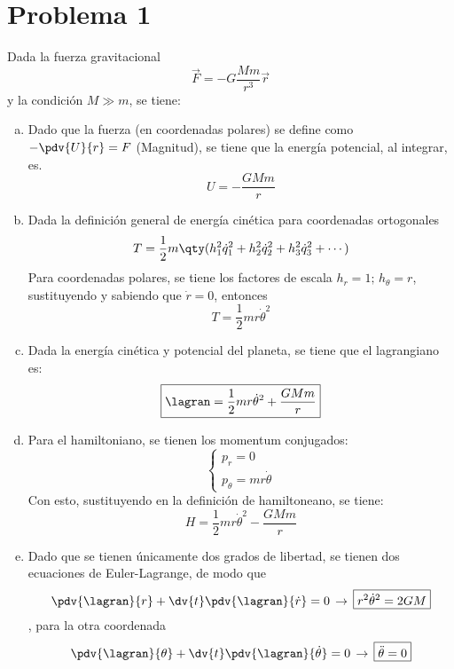 

\section{Problema 1}
Dada la fuerza gravitacional
\begin{displaymath}
	\vec{F} = -G\frac{Mm}{r^3} \vec{r} \nonumber
\end{displaymath}
y la condición $M \gg m$, se tiene:
\begin{enumerate}[a)]
	\item Dado que la fuerza (en coordenadas polares) se define como $-\pdv{U}{r} = F$ (Magnitud), se tiene que la energía potencial, al integrar, es.
		$$\boxed{U = -\frac{GMm}{r}}$$
	\item Dada la definición general de energía cinética para coordenadas ortogonales
		$$T = \frac{1}{2} m\qty(h_1 ^2 \dot{q}_1 ^2 + h_2 ^2 \dot{q}_2 ^2 + h_3 ^2 \dot{q}_3 ^2 + \cdots)$$
		Para coordenadas polares, se tiene los factores de escala $h_r = 1; \, h_\theta = r$, sustituyendo y sabiendo que $\dot{r} = 0$, entonces
		$$\boxed{T = \frac{1}{2} m r\dot{\theta} ^2}$$
	\item Dada la energía cinética y potencial del planeta, se tiene que el lagrangiano es:
		$$\boxed{\lagran = \frac{1}{2} m r\dot{\theta} ^2 + \frac{GMm}{r}}$$
	\item Para el hamiltoniano, se tienen los momentum conjugados:
		$$
			\left\{\begin{array}{c}
				p_r = 0 \\
				p_\theta = mr\dot{\theta}
			\end{array}\right.
		$$
		Con esto, sustituyendo en la definición de hamiltoneano, se tiene:
		$$\boxed{H = \frac{1}{2} m r\dot{\theta} ^2 - \frac{GMm}{r}}$$
	\item Dado que se tienen únicamente dos grados de libertad, se tienen dos ecuaciones de Euler-Lagrange, de modo que
		$$\pdv{\lagran}{r} + \dv{t} \pdv{\lagran}{\dot{r}} = 0 \, \rightarrow \, \boxed{r^2 \dot{\theta} ^2 = 2GM}$$,
		para la otra coordenada
		$$\pdv{\lagran}{\theta} + \dv{t} \pdv{\lagran}{\dot{\theta}} = 0 \, \rightarrow \, \boxed{\ddot{\theta} = 0}$$
\end{enumerate}


